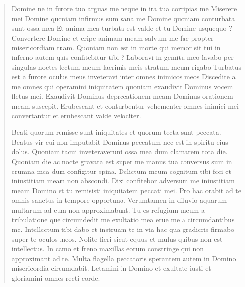 \documentclass[a4paper,12pt,twoside]{book}
\begin{document}
	\begin{quotation}
Domine ne in furore tuo arguas me neque in ira tua corripias me
Miserere mei Domine quoniam infirmus sum sana me Domine quoniam conturbata sunt ossa mea
Et anima mea turbata est valde et tu Domine usquequo ?
Convertere Domine et eripe animam meam salvum me fac propter misericordiam tuam. 
Quoniam non est in morte qui memor sit tui in inferno autem quis confitebitur tibi ? 
Laboravi in gemitu meo lavabo per singulas noctes lectum meum lacrimis meis stratum meum rigabo
Turbatus est a furore oculus meus inveteravi inter omnes inimicos meos
Discedite a me omnes qui operamini iniquitatem quoniam exaudivit Dominus vocem fletus mei.
Exaudivit Dominus deprecationem meam Dominus orationem meam suscepit. 
Erubescant et conturbentur vehementer omnes inimici mei convertantur et erubescant valde velociter.

Beati quorum remisse sunt iniquitates et quorum tecta sunt peccata.
Beatus vir cui non imputabit Dominus peccatum nec est in spiritu eius dolus.
Quoniam tacui inveteraverunt ossa mea dum clamarem tota die.
Quoniam die ac nocte gravata est super me manus tua conversus sum in erumna mea dum configitur spina.
Delictum meum cognitum tibi feci et iniustitiam meam non abscondi.
Dixi confitebor adversum me iniustitiam meam Domino et tu remisisti iniquitatem peccati mei.
Pro hac orabit ad te omnis sanctus in tempore opportuno.
Verumtamen in diluvio aquarum multarum ad eum non approximabunt.
Tu es refugium meum a tribulatione que circumdedit me exultatio mea erue me a circumdantibus me.
Intellectum tibi dabo et instruam te in via hac qua gradieris firmabo super te oculos meos.
Nolite fieri sicut equus et mulus quibus non est intellectus.
In camo et freno maxillas eorum constringe qui non approximant ad te.
Multa flagella peccatoris sperantem autem in Domino misericordia circumdabit.
Letamini in Domino et exultate iusti et gloriamini omnes recti corde.


\end{quotation}
\end{document}
